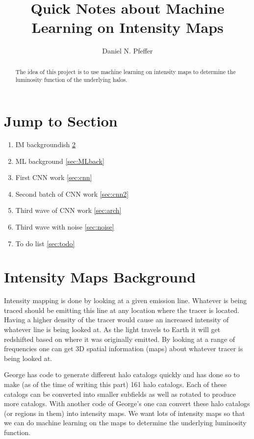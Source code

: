 \documentclass{article}
\title{Quick Notes about Machine Learning on Intensity Maps}
\author{Daniel N. Pfeffer}
\date{}
\begin{document}
% 

	\maketitle

	\begin{abstract}
		The idea of this project is to use machine learning on intensity maps to determine the luminosity function of the underlying halos.
	\end{abstract}

	\section{Jump to Section}
		\begin{enumerate}
			\item IM backgroundish \ref{sec:IMback}

			\item ML background \ref{sec:MLback}

			\item First CNN work \ref{sec:cnn}

			\item Second batch of CNN work \ref{sec:cnn2}

			\item Third wave of CNN work \ref{sec:arch}

			\item Third wave with noise \ref{sec:noise}

			\item To do list \ref{sec:todo}
		\end{enumerate}	

	\section{Intensity Maps Background} \label{sec:IMback}

		Intensity mapping is done by looking at a given emission line.  Whatever is being traced should be emitting this line at any location where the tracer is located.  Having a higher density of the tracer would cause an increased intensity of whatever line is being looked at.  As the light travels to Earth it will get redshifted based on where it was originally emitted.  By looking at a range of frequencies one can get 3D spatial information (maps) about whatever tracer is being looked at.  

		George has code to generate different halo catalogs quickly and has done so to make (as of the time of writing this part) 161 halo catalogs.  Each of these catalogs can be converted into smaller subfields as well as rotated to produce more catalogs.  With another code of George's one can convert these halo catalogs (or regions in them) into intensity maps.  We want lots of intensity maps so that we can do machine learning on the maps to determine the underlying luminosity function.
\end{document}
